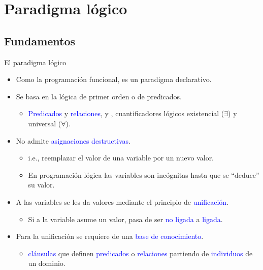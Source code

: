 \documentclass[handout]{beamer} %
\newcommand{\blue}[1]{\textcolor{blue}{#1}}
\newcommand{\redb}[1]{{\color{red!70!black}{#1}}}
\begin{document}

\section{Paradigma lógico}

\subsection{Fundamentos}

\begin{frame}{El paradigma lógico}
  \begin{itemize}
    \item<1-> Como la programación funcional, es un paradigma declarativo.
    \item<2-> Se basa en la lógica de primer orden o de predicados.
    \begin{itemize}
        \item \blue{Predicados} y \blue{relaciones}, \redb{variables} y \redb{constantes}, cuantificadores lógicos existencial ($\exists$) y universal ($\forall$).
    \end{itemize}
    \item<3-> No admite \blue{asignaciones destructivas}.
    \begin{itemize}
        \item i.e., reemplazar el valor de una variable por un nuevo valor.
        \item En programación lógica las variables son incógnitas hasta que se ``deduce'' su valor.
    \end{itemize}
    \item<4-> A las variables se les da valores mediante el principio de \blue{unificación}.
    \begin{itemize}
        \item Si a la variable asume un valor, pasa de ser \blue{no ligada} a \blue{ligada}.
    \end{itemize}
    \item<5-> Para la unificación se requiere de una \blue{base de conocimiento}.
    \begin{itemize}
        \item \blue{cláusulas} que definen \blue{predicados} o \blue{relaciones} partiendo de \blue{individuos} de un dominio.
    \end{itemize}
  \end{itemize}
\end{frame}
\end{document}
